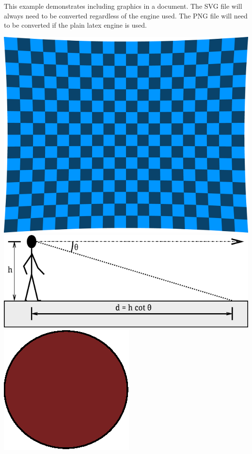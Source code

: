 \documentclass[letterpaper,12pt]{article}
\begin{document}
This example demonstrates including graphics in a document. The SVG file will always need to be converted regardless of the engine used. The PNG file will need to be converted if the plain latex engine is used.

\includegraphics[width=.5\textwidth]{checkerboard}
\includegraphics[width=\textwidth]{subdir/angle-of-decl}
\includegraphics[width=.1\textwidth]{red-circle}
\end{document}
